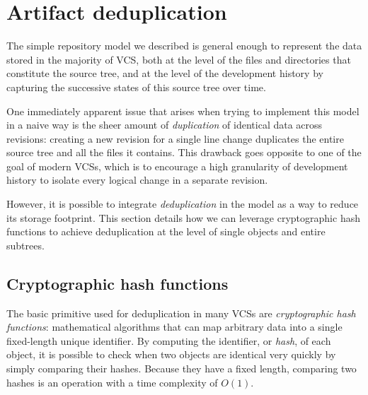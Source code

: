 \section{Artifact deduplication}

The simple repository model we described is general enough to represent the
data stored in the majority of \acrlong{VCS}, both at the level of the files
and directories that constitute the source tree, and at the level of the
development history by capturing the successive states of this source tree over
time.

One immediately apparent issue that arises when trying to implement this model
in a naive way is the sheer amount of \emph{duplication} of identical data
across revisions: creating a new revision for a single line change duplicates
the entire source tree and all the files it contains. This drawback goes
opposite to one of the goal of modern \glspl{VCS}, which is to encourage a high
granularity of development history to isolate every logical change in a
separate revision.

However, it is possible to integrate \emph{deduplication} in the model as a way
to reduce its storage footprint. This section details how we can leverage
cryptographic hash functions to achieve deduplication at the level of single
objects and entire subtrees.

\subsection{Cryptographic hash functions}

The basic primitive used for deduplication in many \glspl{VCS} are
\emph{cryptographic hash functions}: mathematical algorithms that can map
arbitrary data into a single fixed-length unique identifier. By computing the
identifier, or \emph{hash}, of each object, it is possible to check when two
objects are identical very quickly by simply comparing their hashes. Because
they have a fixed length, comparing two hashes is an operation with a time
complexity of $O(1)$.

